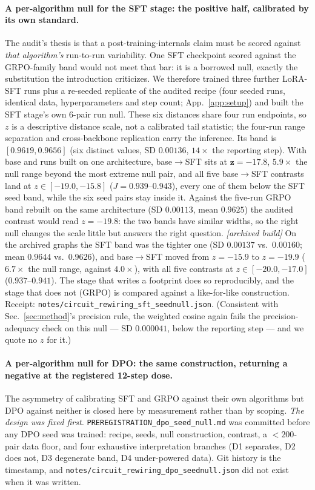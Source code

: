 \documentclass{article}
\begin{document}
\paragraph{A per-algorithm null for the SFT stage: the positive half, calibrated by its own standard.} The audit's thesis is that a post-training-internals claim must be scored against \emph{that algorithm's} run-to-run variability. One SFT checkpoint scored against the GRPO-family band would not meet that bar: it is a borrowed null, exactly the substitution the introduction criticizes. We therefore trained three further LoRA-SFT runs plus a re-seeded replicate of the audited recipe (four seeded runs, identical data, hyperparameters and step count; App.~\ref{app:setup}) and built the SFT stage's own $6$-pair run null. These six distances share four run endpoints, so $z$ is a descriptive distance scale, not a calibrated tail statistic; the four-run range separation and cross-backbone replication carry the inference. Its band is $[0.9619,0.9656]$ (six distinct values, SD $0.00136$, $14\times$ the reporting step). With base and runs built on one architecture, base$\to$SFT sits at $\mathbf{z=-17.8}$, $5.9\times$ the null range beyond the most extreme null pair, and all five base$\to$SFT contrasts land at $z\in[-19.0,-15.8]$ ($J=0.939$--$0.943$), every one of them below the SFT seed band, while the six seed pairs stay inside it. Against the five-run GRPO band rebuilt on the same architecture (SD $0.00113$, mean $0.9625$) the audited contrast would read $z=-19.8$: the two bands have similar widths, so the right null changes the scale little but answers the right question. \emph{[archived build]} On the archived graphs the SFT band was the tighter one (SD $0.00137$ vs.\ $0.00160$; mean $0.9644$ vs.\ $0.9626$), and base$\to$SFT moved from $z=-15.9$ to $z=-19.9$ ($6.7\times$ the null range, against $4.0\times$), with all five contrasts at $z\in[-20.0,-17.0]$ ($0.937$--$0.941$). The stage that writes a footprint does so reproducibly, and the stage that does not (GRPO) is compared against a like-for-like construction. Receipt: \texttt{notes/circuit\_rewiring\_sft\_seednull.json}. (Consistent with Sec.~\ref{sec:method}'s precision rule, the weighted cosine again fails the precision-adequacy check on this null --- SD $0.000041$, below the reporting step --- and we quote no $z$ for it.)

\paragraph{A per-algorithm null for DPO: the same construction, returning a negative at the registered 12-step dose.} The asymmetry of calibrating SFT and GRPO against their own algorithms but DPO against neither is closed here by measurement rather than by scoping. \emph{The design was fixed first.} \texttt{PREREGISTRATION\_dpo\_seed\_null.md} was committed before any DPO seed was trained: recipe, seeds, null construction, contrast, a $<\!200$-pair data floor, and four exhaustive interpretation branches (D1 separates, D2 does not, D3 degenerate band, D4 under-powered data). Git history is the timestamp, and \texttt{notes/circuit\_rewiring\_dpo\_seednull.json} did not exist when it was written.
\end{document}
